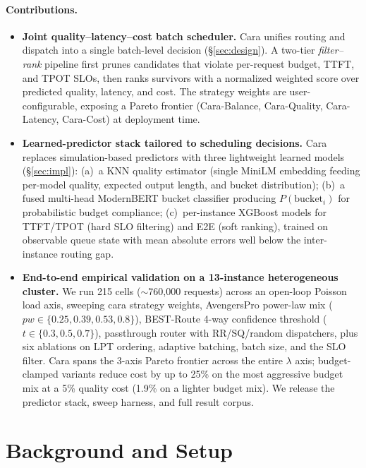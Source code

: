 \documentclass[10pt]{article}
\begin{document}
\paragraph{Contributions.}
\begin{itemize}\itemsep0pt
\item \textbf{Joint quality--latency--cost batch scheduler.} Cara unifies routing and dispatch into a single batch-level decision (\S\ref{sec:design}). A two-tier \emph{filter--rank} pipeline first prunes candidates that violate per-request budget, TTFT, and TPOT SLOs, then ranks survivors with a normalized weighted score over predicted quality, latency, and cost. The strategy weights are user-configurable, exposing a Pareto frontier (Cara-Balance, Cara-Quality, Cara-Latency, Cara-Cost) at deployment time.
\item \textbf{Learned-predictor stack tailored to scheduling decisions.} Cara replaces simulation-based predictors with three lightweight learned models (\S\ref{sec:impl}): (a)~a KNN quality estimator (single MiniLM embedding feeding per-model quality, expected output length, and bucket distribution); (b)~a fused multi-head ModernBERT bucket classifier producing $P(\text{bucket}_i)$ for probabilistic budget compliance; (c)~per-instance XGBoost models for TTFT/TPOT (hard SLO filtering) and E2E (soft ranking), trained on observable queue state with mean absolute errors well below the inter-instance routing gap.
\item \textbf{End-to-end empirical validation on a 13-instance heterogeneous cluster.} We run 215 cells (\(\sim\)760{,}000 requests) across an open-loop Poisson load axis, sweeping cara strategy weights, AvengersPro power-law mix ($pw \in \{0.25, 0.39, 0.53, 0.8\}$), BEST-Route 4-way confidence threshold ($t \in \{0.3, 0.5, 0.7\}$), passthrough router with RR/SQ/random dispatchers, plus six ablations on LPT ordering, adaptive batching, batch size, and the SLO filter. Cara spans the 3-axis Pareto frontier across the entire $\lambda$ axis; budget-clamped variants reduce cost by up to 25\% on the most aggressive budget mix at a 5\% quality cost (1.9\% on a lighter budget mix). We release the predictor stack, sweep harness, and full result corpus.
\end{itemize}

\section{Background and Setup}\label{sec:background}
\end{document}
